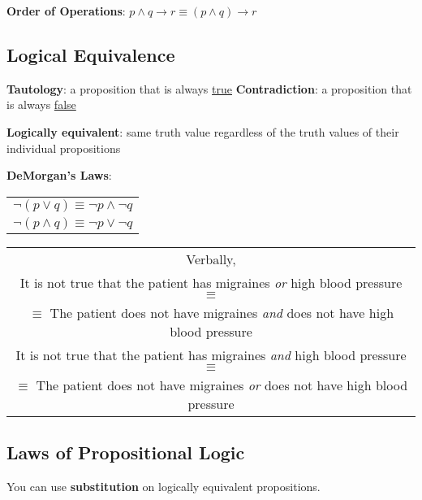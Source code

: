 \documentclass{article}
\begin{document}
\begin{center}
  \textbf{Order of Operations}: \(p \land q \rightarrow r \equiv (p \land q) \rightarrow r\)
\end{center}

\subsection{Logical Equivalence}

\begin{center}
  \textbf{Tautology}: a proposition that is always \underline{true}
  \qquad
  \textbf{Contradiction}: a proposition that is always \underline{false}
\end{center}

\textbf{Logically equivalent}: same truth value regardless of the truth values of their individual propositions

\textbf{DeMorgan's Laws}:
\qquad
\begin{tabular}{c}
  \(\lnot (p \lor q) \equiv \lnot p \land \lnot q\) \\
  \(\lnot (p \land q) \equiv \lnot p \lor \lnot q\)
\end{tabular}

\begin{center}
  \begin{tabular}{c}
    Verbally,                                                                                     \\
    It is not true that the patient has migraines \textit{or} high blood pressure \(\equiv\)      \\
    \(\equiv\) The patient does not have migraines \textit{and} does not have high blood pressure \\
    \hline
    It is not true that the patient has migraines \textit{and} high blood pressure \(\equiv\)     \\
    \(\equiv\) The patient does not have migraines \textit{or} does not have high blood pressure  \\
  \end{tabular}
\end{center}

\subsection{Laws of Propositional Logic}

\begin{center}
  You can use \textbf{substitution} on logically equivalent propositions.
\end{center}
\end{document}
